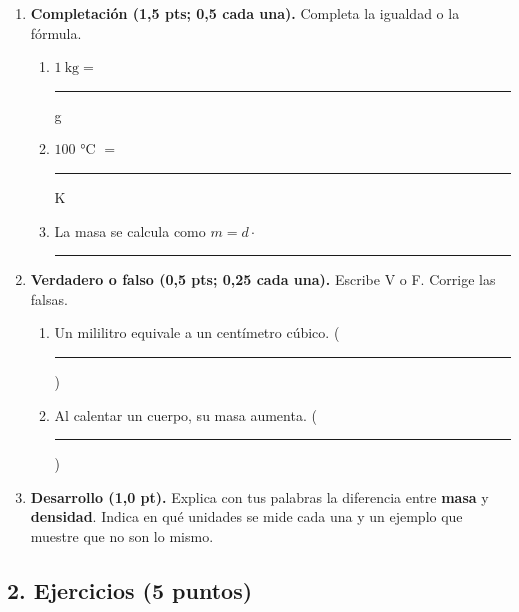 \documentclass[12pt, letterpaper]{article}
\begin{document}
\begin{enumerate}[leftmargin=*, label=\textbf{\arabic*.}, itemsep=0.5em]
  \item \textbf{Completación (1,5 pts; 0,5 cada una).} Completa la igualdad o la fórmula.
        \begin{enumerate}[label=\alph*), leftmargin=1.8em, itemsep=0.4em]
          \item $1\ \text{kg} =$ \rule{2.2cm}{0.4pt} g
          \item $100$ °C $=$ \rule{2.2cm}{0.4pt} K
          \item La masa se calcula como $m = d \cdot$ \rule{2.2cm}{0.4pt}
        \end{enumerate}

  \item \textbf{Verdadero o falso (0,5 pts; 0,25 cada una).} Escribe V o F. Corrige las falsas.
        \begin{enumerate}[label=\alph*), leftmargin=1.8em, itemsep=0.45em]
          \item Un mililitro equivale a un centímetro cúbico.
                \hfill (\rule{0.6cm}{0.4pt})
          \item Al calentar un cuerpo, su masa aumenta.
                \hfill (\rule{0.6cm}{0.4pt})
        \end{enumerate}

  \item \textbf{Desarrollo (1,0 pt).} Explica con tus palabras la diferencia entre
        \textbf{masa} y \textbf{densidad}. Indica en qué unidades se mide cada una
        y un ejemplo que muestre que no son lo mismo.
        \vspace{2.4cm}
\end{enumerate}

\newpage
\subsection*{2. Ejercicios (5 puntos)}
\end{document}
